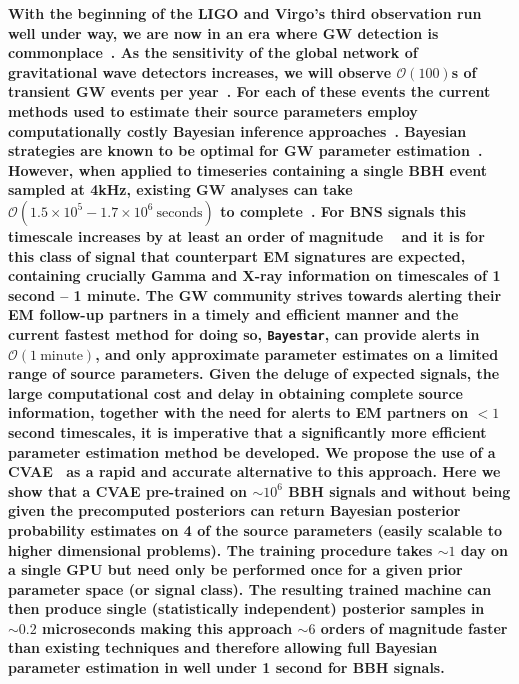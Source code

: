 \documentclass[%
showpacs,
 amsmath,amssymb,
 aps,
 twocolumn,
 prl,
 reprint,
floatfix,
]{revtex4-1}
\begin{document}
%
%
%
\textbf{ 
%
%
With the beginning of the \ac{LIGO} and Virgo's third observation run well
under way, we are now in an era where \ac{GW} detection is
commonplace~\cite{PhysRevLett.116.061102,
PhysRevX.6.041015,PhysRevLett.119.161101}. As the sensitivity of the global
network of gravitational wave detectors increases, we will observe
$\mathcal{O}(100)$s of transient \ac{GW} events per year~\cite{1409.7215}. For
each of these events the current methods used to estimate their source
parameters employ computationally costly Bayesian inference
approaches~\cite{1409.7215}.
%
%
Bayesian strategies are known to be optimal for \ac{GW} parameter
estimation~\cite{Searle_paper}. However, when applied to timeseries containing
a single \ac{BBH} event sampled at 4kHz, existing \ac{GW} analyses can take
$\mathcal{O}(1.5\times 10^{5} - 1.7\times 10^{6}\:\textrm{seconds})$ to
complete~\cite{1409.7215}. For \ac{BNS} signals this timescale increases by at
least an order of magnitude ~\cite{PhysRevLett.119.161101} and it is for this class of
signal that counterpart \ac{EM} signatures are expected, containing crucially
Gamma and X-ray information on timescales of 1 second -- 1 minute. The \ac{GW}
community strives towards alerting their \ac{EM} follow-up partners in a timely
and efficient manner and the current fastest method for doing so,
\texttt{Bayestar}, can provide alerts in $\mathcal{O}(1\: \textrm{minute})$,
and only approximate parameter estimates on a limited range of source
parameters. Given the deluge of expected signals, the large computational cost
and delay in obtaining complete source information, together with the need for
alerts to \ac{EM} partners on $<1$ second timescales, it is imperative that a
significantly more efficient parameter estimation method be developed. We
propose the use of a \ac{CVAE}~\cite{1904.06264,1812.04405} as a rapid and
accurate alternative to this approach. 
%
%
Here we show that a \ac{CVAE} pre-trained on $\sim 10^{6}$ \ac{BBH} signals and
without being given the precomputed posteriors can return Bayesian posterior
probability estimates on 4 of the source parameters (easily scalable to higher
dimensional problems). The training procedure takes $\sim 1$ day on a single
\ac{GPU} but need only be performed once for a given prior parameter space (or
signal class). The resulting trained machine can then produce single
(statistically independent) posterior samples in $\sim 0.2$ microseconds making
this approach $\sim 6$ orders of magnitude faster than existing techniques and
therefore allowing full Bayesian parameter estimation in well under 1 second
for \ac{BBH} signals.}
\end{document}
